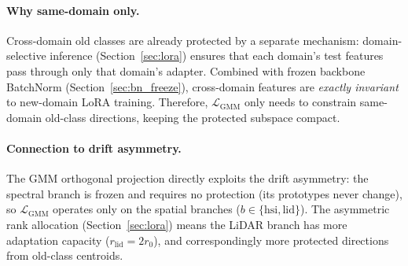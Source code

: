 \paragraph{Why same-domain only.}
Cross-domain old classes are already protected by a separate mechanism: domain-selective inference (Section~\ref{sec:lora}) ensures that each domain's test features pass through only that domain's adapter.
Combined with frozen backbone BatchNorm (Section~\ref{sec:bn_freeze}), cross-domain features are \emph{exactly invariant} to new-domain LoRA training.
Therefore, $\mathcal{L}_{\mathrm{GMM}}$ only needs to constrain same-domain old-class directions, keeping the protected subspace compact.

\paragraph{Connection to drift asymmetry.}
The GMM orthogonal projection directly exploits the drift asymmetry:
the spectral branch is frozen and requires no protection (its prototypes never change), so $\mathcal{L}_{\mathrm{GMM}}$ operates only on the spatial branches ($b \in \{\mathrm{hsi}, \mathrm{lid}\}$).
The asymmetric rank allocation (Section~\ref{sec:lora}) means the LiDAR branch has more adaptation capacity ($r_{\mathrm{lid}} = 2r_0$), and correspondingly more protected directions from old-class centroids.

